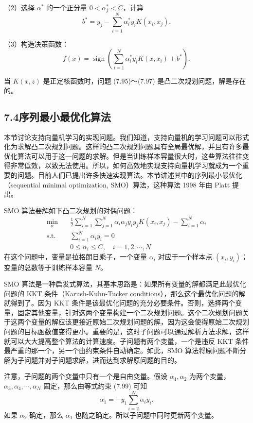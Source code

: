 \documentclass[UTF8,12pt,a4paper,fontset=fandol]{ctexart}
\begin{document}
（2）选择 $\alpha^*$ 的一个正分量 $0<\alpha_j^*<C$，计算
\[
b^*=y_j-\sum_{i=1}^N\alpha_i^*y_iK(x_i,x_j).
\]

（3）构造决策函数：
\[
f(x)=\operatorname{sign}\left(\sum_{i=1}^N\alpha_i^*y_iK(x,x_i)+b^*\right).
\]

当 $K(x,z)$ 是正定核函数时，问题 (7.95)～(7.97) 是凸二次规划问题，解是存在的。

\subsection*{7.4\quad 序列最小最优化算法}

本节讨论支持向量机学习的实现问题。我们知道，支持向量机的学习问题可以形式化为求解凸二次规划问题。这样的凸二次规划问题具有全局最优解，并且有许多最优化算法可以用于这一问题的求解。但是当训练样本容量很大时，这些算法往往变得非常低效，以致无法使用。所以，如何高效地实现支持向量机学习就成为一个重要的问题。目前人们已提出许多快速实现算法。本节讲述其中的序列最小最优化（sequential minimal optimization, SMO）算法，这种算法 1998 年由 Platt 提出。

SMO 算法要解如下凸二次规划的对偶问题：
\begin{equation}
\begin{aligned}
\min_\alpha\quad & \frac{1}{2}\sum_{i=1}^N\sum_{j=1}^N\alpha_i\alpha_j y_i y_jK(x_i,x_j)-\sum_{i=1}^N\alpha_i\\
\mathrm{s.t.}\quad & \sum_{i=1}^N\alpha_i y_i=0\\
& 0\leq \alpha_i\leq C,\quad i=1,2,\cdots,N
\end{aligned}
\tag{7.98--7.100}
\end{equation}
在这个问题中，变量是拉格朗日乘子，一个变量 $\alpha_i$ 对应于一个样本点 $(x_i,y_i)$；变量的总数等于训练样本容量 $N$。

SMO 算法是一种启发式算法，其基本思路是：如果所有变量的解都满足此最优化问题的 KKT 条件（Karush-Kuhn-Tucker conditions），那么这个最优化问题的解就得到了。因为 KKT 条件是该最优化问题的充分必要条件。否则，选择两个变量，固定其他变量，针对这两个变量构建一个二次规划问题。这个二次规划问题关于这两个变量的解应该更接近原始二次规划问题的解，因为这会使得原始二次规划问题的目标函数值变得更小。重要的是，这时子问题可以通过解析方法求解，这样就可以大大提高整个算法的计算速度。子问题有两个变量，一个是违反 KKT 条件最严重的那一个，另一个由约束条件自动确定。如此，SMO 算法将原问题不断分解为子问题并对子问题求解，进而达到求解原问题的目的。

注意，子问题的两个变量中只有一个是自由变量。假设 $\alpha_1,\alpha_2$ 为两个变量，$\alpha_3,\alpha_4,\cdots,\alpha_N$ 固定，那么由等式约束 (7.99) 可知
\[
\alpha_1=-y_1\sum_{i=2}^N\alpha_i y_i.
\]
如果 $\alpha_2$ 确定，那么 $\alpha_1$ 也随之确定。所以子问题中同时更新两个变量。
\end{document}
